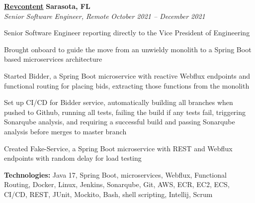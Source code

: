 %
    \headerrow
        {\textbf{\href{https://www.revcontent.com/}{Revcontent}}}
        {\textbf{Sarasota, FL}}
    \\
    \headerrow
        {\emph{Senior Software Engineer, Remote}}
        {\emph{October 2021 -- December 2021}}
    \begin{itemize*}
        \item Senior Software Engineer reporting directly to the Vice President of Engineering
        \item Brought onboard to guide the move from an unwieldy monolith to a Spring Boot based
            microservices architecture
        \item Started Bidder, a Spring Boot microservice with reactive Webflux endpoints and functional
            routing for placing bids, extracting those functions from the monolith
        \item Set up CI/CD for Bidder service, automatically building all branches when pushed to Github,
            running all tests, failing the build if any tests fail, triggering Sonarqube analysis, and requiring
            a successful build and passing Sonarqube analysis before merges to master branch
        \item Created Fake-Service, a Spring Boot microservice with REST and Webflux endpoints with random
            delay for load testing
    \end{itemize*}

    \hspace{1.0em}
        {\textbf{Technologies:} Java 17, Spring Boot, microservices, Webflux, Functional Routing,
        Docker, Linux, Jenkins, Sonarqube, Git, AWS, ECR, EC2, ECS, CI/CD, REST, JUnit, Mockito, Bash, shell scripting, Intellij, Scrum}

